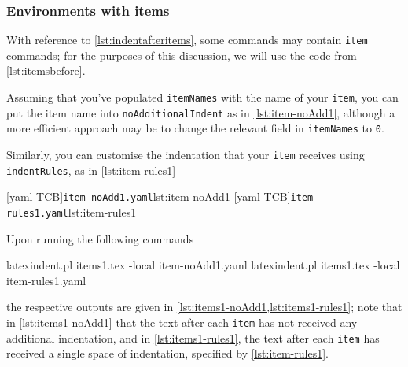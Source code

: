 \subsubsection{Environments with items}
 With reference to \vref{lst:indentafteritems}, some commands may contain \texttt{item}
 commands; for the purposes of this discussion, we will use the code from
 \vref{lst:itemsbefore}.

 Assuming that you've populated \texttt{itemNames} with the name of your \texttt{item},
 you can put the item name into \texttt{noAdditionalIndent} as in \cref{lst:item-noAdd1},
 although a more efficient approach may be to change the relevant field in
 \texttt{itemNames} to \texttt{0}.

 \begin{example}
 Similarly, you can customise the indentation that your \texttt{item} receives using
 \texttt{indentRules}, as in \cref{lst:item-rules1}

 \begin{cmhtcbraster}[raster column skip=.1\linewidth]
  [yaml-TCB]{\texttt{item-noAdd1.yaml}}{lst:item-noAdd1}
  [yaml-TCB]{\texttt{item-rules1.yaml}}{lst:item-rules1}
 \end{cmhtcbraster}

 Upon running the following commands 

 \begin{commandshell}
latexindent.pl items1.tex -local item-noAdd1.yaml  
latexindent.pl items1.tex -local item-rules1.yaml  
\end{commandshell}

 the respective outputs are given in \cref{lst:items1-noAdd1,lst:items1-rules1}; note
 that in \cref{lst:items1-noAdd1} that the text after each \texttt{item} has not received
 any additional indentation, and in \cref{lst:items1-rules1}, the text after each
 \texttt{item} has received a single space of indentation, specified by
 \cref{lst:item-rules1}.

 \begin{cmhtcbraster}
 \end{cmhtcbraster}
 \end{example}


